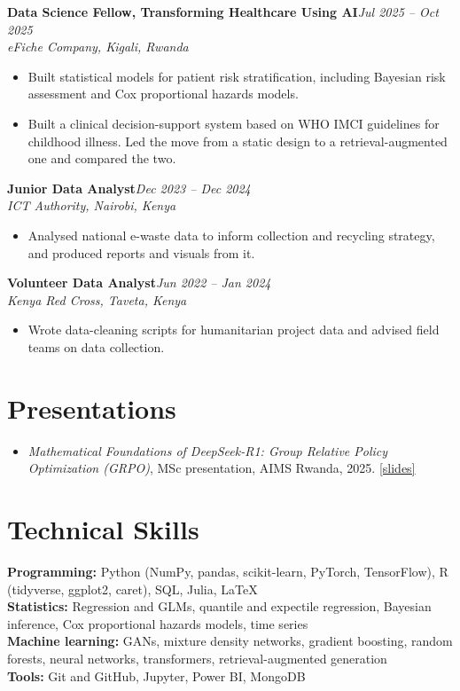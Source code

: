 \documentclass[10pt,a4paper]{article}
\newcommand{\entry}[3]{%
  \textbf{#1}\hfill\textit{#2}\\
  \textit{#3}\par\vspace{0.2ex}}
\begin{document}
\entry{Data Science Fellow, Transforming Healthcare Using AI}{Jul 2025 -- Oct 2025}{eFiche Company, Kigali, Rwanda}
\begin{itemize}
  \item Built statistical models for patient risk stratification, including Bayesian risk assessment and Cox proportional hazards models.
  \item Built a clinical decision-support system based on WHO IMCI guidelines for childhood illness. Led the move from a static design to a retrieval-augmented one and compared the two.
\end{itemize}

\entry{Junior Data Analyst}{Dec 2023 -- Dec 2024}{ICT Authority, Nairobi, Kenya}
\begin{itemize}
  \item Analysed national e-waste data to inform collection and recycling strategy, and produced reports and visuals from it.
\end{itemize}

\entry{Volunteer Data Analyst}{Jun 2022 -- Jan 2024}{Kenya Red Cross, Taveta, Kenya}
\begin{itemize}
  \item Wrote data-cleaning scripts for humanitarian project data and advised field teams on data collection.
\end{itemize}

\section{Presentations}
\begin{itemize}
  \item \textit{Mathematical Foundations of DeepSeek-R1: Group Relative Policy Optimization (GRPO)}, MSc presentation, AIMS Rwanda, 2025.
        \href{https://jowie1111.github.io/deepseek-grpo-slides.pdf}{[slides]}
\end{itemize}

\section{Technical Skills}
\textbf{Programming:} Python (NumPy, pandas, scikit-learn, PyTorch, TensorFlow), R (tidyverse, ggplot2, caret), SQL, Julia, \LaTeX\\
\textbf{Statistics:} Regression and GLMs, quantile and expectile regression, Bayesian inference, Cox proportional hazards models, time series\\
\textbf{Machine learning:} GANs, mixture density networks, gradient boosting, random forests, neural networks, transformers, retrieval-augmented generation\\
\textbf{Tools:} Git and GitHub, Jupyter, Power BI, MongoDB
\end{document}
